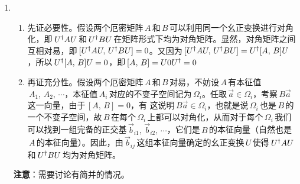 \begin{enumerate}[label=2.\arabic*, leftmargin=-0.5mm]
\item
\begin{enumerate}[label=(\arabic*)]
    \item 先证必要性。假设两个厄密矩阵$\,A\,$和$\,B\,$可以利用同一个幺正变换进行对角化，即$\,U^\dagger AU\,$和$\,U^\dagger BU\,$在矩阵形式下均为对角矩阵。显然，对角矩阵之间互相对易，即$\,[U^\dagger AU,\,U^\dagger BU]=0$。又因为$\,[U^\dagger AU,\,U^\dagger BU]=U^\dagger[A,\,B]U$，所以$\,U^\dagger[A,\,B]U=0$，即$\,[A,\,B]=U0U^\dagger=0$
    \item 再证充分性。假设两个厄密矩阵$\,A\,$和$\,B\,$对易，不妨设$\,A\,$有本征值$\,A_1,\,A_2,\,\cdots$，本征值$\,A_i\,$对应的不变子空间记为$\,\varOmega_i$。任取$\,\vec{a}\in\varOmega_i$，考察$\,B\vec{a}\,$这一向量，由于$\,[A,\,B]=0$，有
    这说明$\,B\vec{a}\in\varOmega_i$，也就是说$\,\varOmega_i\,$也是$\,B\,$的一个不变子空间，故$\,B\,$在每个$\,\varOmega_i\,$上都可以对角化，从而对于每个$\,\varOmega_i\,$我们可以找到一组完备的正交基$\,\vec{b}_{i1},\,\vec{b}_{i2},\,\cdots$，它们是$\,B\,$的本征向量（自然也是$\,A\,$的本征向量）。因此，由$\,\vec{b}_{ij}\,$这组本征向量确定的幺正变换$\,U\,$使得$\,U^\dagger AU\,$和$\,U^\dagger BU\,$均为对角矩阵。
\end{enumerate}
{\color{red}\textbf{注意}：需要讨论有简并的情况。}


\end{enumerate}
